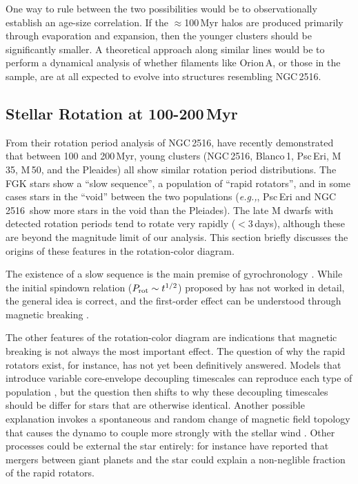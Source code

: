 \documentclass[12pt,twocolumn,tighten]{aastex63}
\newcommand{\cn}{NGC\,2516} %
\begin{document}
One way to rule between the two possibilities would be to
observationally establish an age-size correlation.  If the
$\approx$100\,Myr halos are produced primarily through evaporation and
expansion, then the younger clusters should be significantly smaller.
A theoretical approach along similar lines would be to perform a
dynamical analysis of whether filaments like Orion\,A, or those in the
\citet{zucker_physical_2018} sample, are at all expected to evolve
into structures resembling \cn.


\subsection{Stellar Rotation at 100-200\,Myr}
\label{disc:rotn}

From their rotation period analysis of \cn,
\citet{fritzewski_rotation_2020} have recently demonstrated that
between 100 and 200\,Myr, young clusters (\cn, Blanco\,1, Psc\,Eri,
M\,35, M\,50, and the Pleaides) all show similar rotation period
distributions.  The FGK stars show a ``slow sequence'', a population
of ``rapid rotators'', and in some cases stars in the ``void'' between
the two populations ({\it e.g.,}, Psc\,Eri and \cn\ show more stars in
the void than the Pleiades).  The late M dwarfs with detected rotation
periods tend to rotate very rapidly ($<3$\,days), although these are
beyond the magnitude limit of our analysis.  This section briefly
discusses the origins of these features in the rotation-color diagram.

The existence of a slow sequence is the main premise of gyrochronology
\citep[{\it e.g.},][]{barnes_rotational_2003}.  While the initial
spindown relation ($P_{\rm rot}\sim t^{1/2}$) proposed by
\citet{skumanich_time_1972} has not worked in detail, the general idea
is correct, and the first-order effect can be understood through
magnetic breaking \citep{weber_angular_1967}.

The other features of the rotation-color diagram are indications that
magnetic breaking is not always the most important effect.  The
question of why the rapid rotators exist, for instance, has not yet
been definitively answered.  Models that introduce variable
core-envelope decoupling timescales can reproduce each type of
population \citep{Irwin_NGC2516_2007}, but the question then shifts to
why these decoupling timescales should be differ for stars that are
otherwise identical.  Another possible explanation invokes a
spontaneous and random change of magnetic field topology that causes
the dynamo to couple more strongly with the stellar wind
\citep{brown_metastable_2014}.  Other processes could be external the
star entirely: \citet{qureshi_signature_2018} for instance have
reported that mergers between giant planets and the star could explain
a non-neglible fraction of the rapid rotators.
\end{document}
